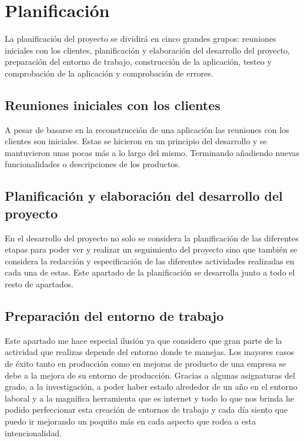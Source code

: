 \section{Planificación}

La planificación del proyecto se dividirá en cinco grandes grupos: reuniones iniciales con los clientes, planificación y elaboración del desarrollo del proyecto, preparación del entorno de trabajo, construcción de la aplicación, testeo y comprobación de la aplicación y comprobación de errores.

\subsection{Reuniones iniciales con los clientes}

A pesar de basarse en la reconstrucción de una aplicación las reuniones con los clientes son iniciales. Estas se hicieron en un principio del desarrollo y se mantuvieron unas pocas más a lo largo del mismo. Terminando añadiendo nuevas funcionalidades o descripciones de los productos.

\subsection{Planificación y elaboración del desarrollo del proyecto}

En el desarrollo del proyecto no solo se considera la planificación de las diferentes etapas para poder ver y realizar un seguimiento del proyecto sino que también se considera la redacción y especificación de las diferentes actividades realizadas en cada una de estas. Este apartado de la planificación se desarrolla junto a todo el resto de apartados.

\subsection{Preparación del entorno de trabajo}

Este apartado me hace especial ilusión ya que considero que gran parte de la actividad que realizas depende del entorno donde te manejas. Los mayores casos de éxito tanto en producción como en mejoras de producto de una empresa se debe a la mejora de su entorno de producción. Gracias a algunas asignaturas del grado, a la investigación, a poder haber estado alrededor de un año en el entorno laboral y a la magnífica herramienta que es internet y todo lo que nos brinda he podido perfeccionar esta creación de entornos de trabajo y cada día siento que puedo ir mejorando un poquito más en cada aspecto que rodea a esta intencionalidad.

